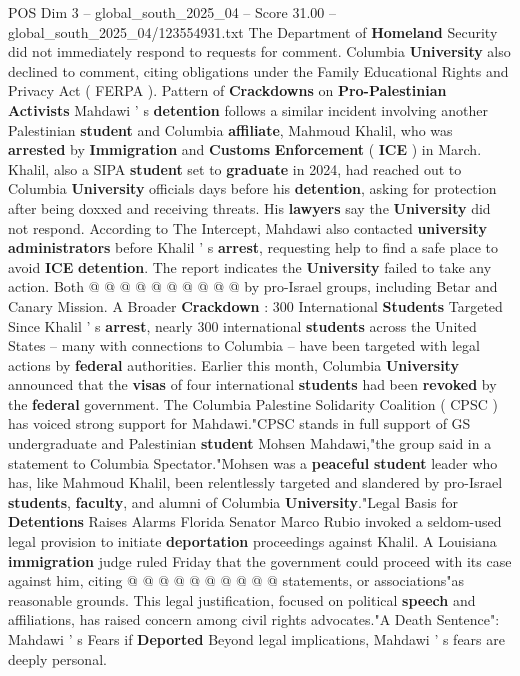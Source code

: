 \begin{textsample}{POS Dim 3 – global\_south\_2025\_04 – Score 31.00 – global\_south\_2025\_04/123554931.txt}
The Department of \textbf{Homeland} Security did not immediately respond to requests for comment.
Columbia \textbf{University} also declined to comment, citing obligations under the Family Educational Rights and Privacy Act ( FERPA ).
Pattern of \textbf{Crackdowns} on \textbf{Pro-Palestinian} \textbf{Activists} Mahdawi ' s \textbf{detention} follows a similar incident involving another Palestinian \textbf{student} and Columbia \textbf{affiliate}, Mahmoud Khalil, who was \textbf{arrested} by \textbf{Immigration} and \textbf{Customs} \textbf{Enforcement} ( \textbf{ICE} ) in March.
Khalil, also a SIPA \textbf{student} set to \textbf{graduate} in 2024, had reached out to Columbia \textbf{University} officials days before his \textbf{detention}, asking for protection after being doxxed and receiving threats.
His \textbf{lawyers} say the \textbf{University} did not respond.
According to The Intercept, Mahdawi also contacted \textbf{university} \textbf{administrators} before Khalil ' s \textbf{arrest}, requesting help to find a safe place to avoid \textbf{ICE} \textbf{detention}.
The report indicates the \textbf{University} failed to take any action.
Both @ @ @ @ @ @ @ @ @ @ by pro-Israel groups, including Betar and Canary Mission.
A Broader \textbf{Crackdown} : 300 International \textbf{Students} Targeted Since Khalil ' s \textbf{arrest}, nearly 300 international \textbf{students} across the United States -- many with connections to Columbia -- have been targeted with legal actions by \textbf{federal} authorities.
Earlier this month, Columbia \textbf{University} announced that the \textbf{visas} of four international \textbf{students} had been \textbf{revoked} by the \textbf{federal} government.
The Columbia Palestine Solidarity Coalition ( CPSC ) has voiced strong support for Mahdawi."CPSC stands in full support of GS undergraduate and Palestinian \textbf{student} Mohsen Mahdawi,"the group said in a statement to Columbia Spectator."Mohsen was a \textbf{peaceful} \textbf{student} leader who has, like Mahmoud Khalil, been relentlessly targeted and slandered by pro-Israel \textbf{students}, \textbf{faculty}, and alumni of Columbia \textbf{University}."Legal Basis for \textbf{Detentions} Raises Alarms Florida Senator Marco Rubio invoked a seldom-used legal provision to initiate \textbf{deportation} proceedings against Khalil.
A Louisiana \textbf{immigration} judge ruled Friday that the government could proceed with its case against him, citing @ @ @ @ @ @ @ @ @ @ statements, or associations"as reasonable grounds.
This legal justification, focused on political \textbf{speech} and affiliations, has raised concern among civil rights advocates."A Death Sentence": Mahdawi ' s Fears if \textbf{Deported} Beyond legal implications, Mahdawi ' s fears are deeply personal.

\end{textsample}
